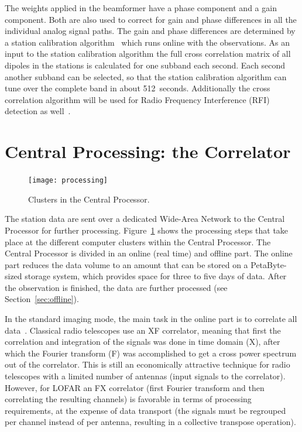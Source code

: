 \documentclass[journal]{IEEEtran}
\begin{document}
The weights applied in the beamformer have a phase component and a gain component. Both are also used to correct for gain and phase differences in all the individual analog signal paths. The gain and phase differences are determined by a station calibration algorithm~\cite{stefan:06} which runs online with the observations. As an input to the station calibration algorithm the full cross correlation matrix of all dipoles in the stations is calculated for one subband each second. Each second another subband can be selected, so that the station calibration algorithm can tune over the complete band in about 512~seconds. Additionally the cross correlation algorithm will be used for Radio Frequency Interference (RFI) detection as well~\cite{Boonstra:05}.

\section{Central Processing: the Correlator}
\label{sec:corr}

\begin{figure}
\begin{center}
\texttt{[image: processing]}
\end{center}
\caption{Clusters in the Central Processor.}
\label{fig:CEP}
\end{figure}

The station data are sent over a dedicated Wide-Area Network to the Central
Processor for further processing.
Figure~\ref{fig:CEP} shows the processing steps that take place at the
different computer clusters within the Central Processor.
The Central Processor is divided in an online (real time) and offline part.
The online part reduces the data volume to an amount that can be stored on
a PetaByte-sized storage system, which provides space for three to five days
of data.
After the observation is finished, the data are further processed (see
Section~\ref{sec:offline}).

In the standard imaging mode, the main task in the online part is to
correlate all data~\cite{Romein:06}.
Classical radio telescopes use an XF correlator, meaning that first the
correlation and integration of the signals was done in time domain (X),
after which the Fourier transform (F) was accomplished to get a cross power
spectrum out of the correlator.
This is still an economically attractive technique for radio telescopes with
a limited number of antennas (input signals to the correlator).
However, for LOFAR an FX correlator (first Fourier transform and then
correlating the resulting channels) is favorable in terms of processing
requirements, at the expense of data transport (the signals must be regrouped
per channel instead of per antenna, resulting in a collective transpose
operation).
\end{document}
